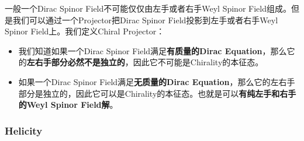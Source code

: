 \bigskip
{}

一般一个Dirac Spinor Field不可能仅仅由左手或者右手Weyl Spinor
Field组成。但是我们可以通过一个Projector把Dirac Spinor Field投影到左手或者右手Weyl Spinor
Field上。我们定义Chiral Projector：

\bigskip
{}

\begin{itemize}
  \item 我们知道如果一个Dirac Spinor Field满足\textbf{有质量的Dirac
    Equation}，那么它的\textbf{左右手部分必然不是独立的}，因此它不可能是Chirality的本征态。
  \item 如果一个Dirac Spinor Field满足\textbf{无质量的Dirac
    Equation}，那么它的左右手部分是独立的，因此它可以是Chirality的本征态。也就是可以\textbf{有纯左手和右手的Weyl
    Spinor Field解}。
\end{itemize}

\subsubsection{Helicity}


